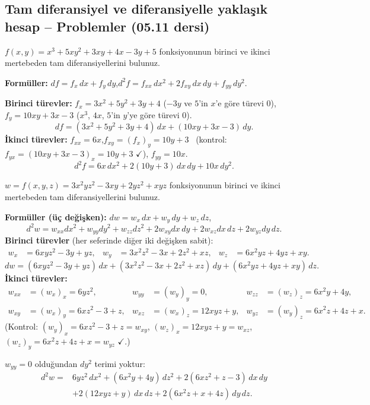 \subsection{Tam diferansiyel ve diferansiyelle yaklaşık hesap -- Problemler (05.11 dersi)}

\begin{soru}
$f(x,y)=x^3+5xy^2+3xy+4x-3y+5$ fonksiyonunun birinci ve ikinci mertebeden tam diferansiyellerini bulunuz.
\end{soru}
\begin{cevap}
\textbf{Formüller:} $df=f_x\,dx+f_y\,dy$,\quad $d^2f=f_{xx}\,dx^2+2f_{xy}\,dx\,dy+f_{yy}\,dy^2$.

\textbf{Birinci türevler:} $f_x=3x^2+5y^2+3y+4$ ($-3y$ ve $5$'in $x$'e göre türevi $0$),\quad
$f_y=10xy+3x-3$ ($x^3$, $4x$, $5$'in $y$'ye göre türevi $0$).
\[ df=(3x^2+5y^2+3y+4)\,dx+(10xy+3x-3)\,dy . \]
\textbf{İkinci türevler:} $f_{xx}=6x$,\quad $f_{xy}=(f_x)_y=10y+3$ \ (kontrol: $f_{yx}=(10xy+3x-3)_x=10y+3$ $\checkmark$),\quad
$f_{yy}=10x$.
\[ d^2f=6x\,dx^2+2(10y+3)\,dx\,dy+10x\,dy^2 . \]
\end{cevap}

\begin{soru}
$w=f(x,y,z)=3x^2yz^2-3xy+2yz^2+xyz$ fonksiyonunun birinci ve ikinci mertebeden tam diferansiyellerini bulunuz.
\end{soru}
\begin{cevap}
\textbf{Formüller (üç değişken):} $dw=w_x\,dx+w_y\,dy+w_z\,dz$,
\[ d^2w=w_{xx}dx^2+w_{yy}dy^2+w_{zz}dz^2+2w_{xy}dx\,dy+2w_{xz}dx\,dz+2w_{yz}dy\,dz . \]
\textbf{Birinci türevler} (her seferinde diğer iki değişken sabit):
\begin{align*}
w_x&=6xyz^2-3y+yz, & w_y&=3x^2z^2-3x+2z^2+xz, & w_z&=6x^2yz+4yz+xy .
\end{align*}
\[ dw=(6xyz^2-3y+yz)\,dx+(3x^2z^2-3x+2z^2+xz)\,dy+(6x^2yz+4yz+xy)\,dz . \]
\textbf{İkinci türevler:}
\begin{align*}
w_{xx}&=(w_x)_x=6yz^2, & w_{yy}&=(w_y)_y=0, & w_{zz}&=(w_z)_z=6x^2y+4y,\\
w_{xy}&=(w_x)_y=6xz^2-3+z, & w_{xz}&=(w_x)_z=12xyz+y, & w_{yz}&=(w_y)_z=6x^2z+4z+x .
\end{align*}
(Kontrol: $(w_y)_x=6xz^2-3+z=w_{xy}$, $(w_z)_x=12xyz+y=w_{xz}$, $(w_z)_y=6x^2z+4z+x=w_{yz}$ $\checkmark$.)

$w_{yy}=0$ olduğundan $dy^2$ terimi yoktur:
\begin{align*}
d^2w={}&6yz^2\,dx^2+(6x^2y+4y)\,dz^2+2(6xz^2+z-3)\,dx\,dy\\
&+2(12xyz+y)\,dx\,dz+2(6x^2z+x+4z)\,dy\,dz .
\end{align*}
\end{cevap}

